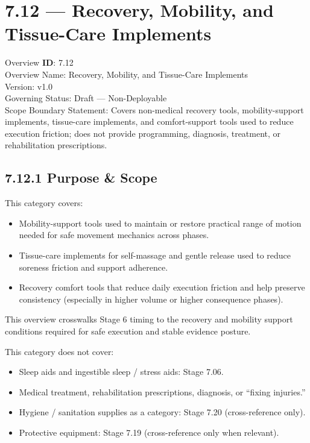 \documentclass[10pt]{article}
\begin{document}
\section*{7.12 — Recovery, Mobility, and Tissue-Care Implements}
{}

Overview \textbf{ID}: 7.12\\
Overview Name: Recovery, Mobility, and Tissue-Care Implements\\
Version: v1.0\\
Governing Status: Draft — Non-Deployable\\
Scope Boundary Statement: Covers non-medical recovery tools, mobility-support implements, tissue-care implements, and comfort-support tools used to reduce execution friction; does not provide programming, diagnosis, treatment, or rehabilitation prescriptions.

\subsection*{7.12.1 Purpose \& Scope}
{}

This category covers:

\begin{itemize}
\item Mobility-support tools used to maintain or restore practical range of motion needed for safe movement mechanics across phases.
\item Tissue-care implements for self-massage and gentle release used to reduce soreness friction and support adherence.
\item Recovery comfort tools that reduce daily execution friction and help preserve consistency (especially in higher volume or higher consequence phases).
\end{itemize}

This overview crosswalks Stage 6 timing to the recovery and mobility support conditions required for safe execution and stable evidence posture.

This category does not cover:

\begin{itemize}
\item Sleep aids and ingestible sleep / stress aids: Stage 7.06.
\item Medical treatment, rehabilitation prescriptions, diagnosis, or “fixing injuries.”
\item Hygiene / sanitation supplies as a category: Stage 7.20 (cross-reference only).
\item Protective equipment: Stage 7.19 (cross-reference only when relevant).
\end{itemize}
\end{document}
